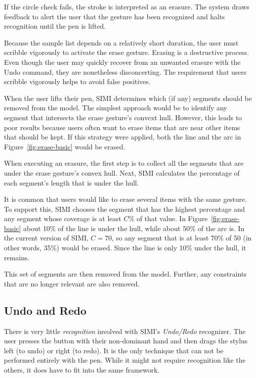 If the circle check fails, the stroke is interpreted as an
erasure. The system draws feedback to alert the user that the gesture
has been recognized and halts recognition until the pen is lifted.


Because the sample list depends on a relatively short duration, the
user must scribble vigorously to activate the erase gesture. Erasing
is a destructive process. Even though the user may quickly recover
from an unwanted erasure with the Undo command, they are nonetheless
disconcerting. The requirement that users scribble vigorously helps to
avoid false positives.

When the user lifts their pen, SIMI determines which (if any) segments
should be removed from the model. The simplest approach would be to
identify any segment that intersects the erase gesture's convext
hull. However, this leads to poor results because users often want to
erase items that are near other items that should be kept. If this
strategy were applied, both the line and the arc in
Figure~\ref{fig:erase-basic} would be erased.

When executing an erasure, the first step is to collect all the
segments that are under the erase gesture's convex hull. Next, SIMI
calculates the percentage of each segment's length that is under the
hull. 

It is common that users would like to erase several items with the
same gesture. To support this, SIMI chooses the segment that has the
highest percentage and any segment whose coverage is at least $C\%$ of
that value. In Figure~\ref{fig:erase-basic} about 10\% of the line is
under the hull, while about 50\% of the arc is. In the current version
of SIMI, $C=70$, so any segment that is at least 70\% of 50 (in other
words, 35\%) would be erased. Since the line is only 10\% under the
hull, it remains.

This set of segments are then removed from the model. Further, any
constraints that are no longer relevant are also removed.



\subsection{Undo and Redo}

There is very little \textit{recognition} involved with SIMI's
\textit{Undo/Redo} recognizer. The user presses the button with their
non-dominant hand and then drags the stylus left (to undo) or right
(to redo). It is the only technique that can not be performed entirely
with the pen. While it might not require recognition like the others,
it does have to fit into the same framework.

